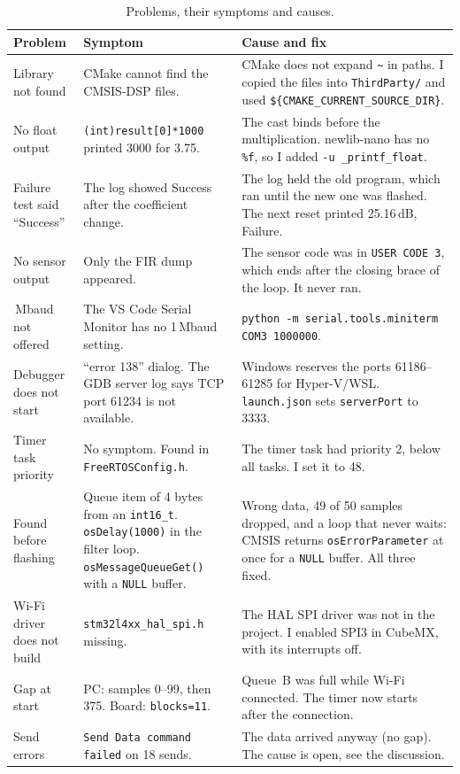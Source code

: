 \documentclass[11pt,a4paper]{article}
\begin{document}
\begin{table}[H]
\centering
\caption{Problems, their symptoms and causes.}
\label{tab:problems}
\footnotesize
\begin{tabular}{@{}>{\raggedright\arraybackslash}p{2.9cm}%
                  >{\raggedright\arraybackslash}p{5.0cm}%
                  >{\raggedright\arraybackslash}p{7.3cm}@{}}
\toprule
Problem & Symptom & Cause and fix \\
\midrule
Library not found &
  CMake cannot find the CMSIS-DSP files. &
  CMake does not expand \texttt{\~{}} in paths. I copied the files into
  \texttt{ThirdParty/} and used \texttt{\$\{CMAKE\_CURRENT\_SOURCE\_DIR\}}. \\
No float output &
  \texttt{(int)result[0]*1000} printed 3000 for 3.75. &
  The cast binds before the multiplication. newlib-nano has no
  \texttt{\%f}, so I added \texttt{-u \_printf\_float}. \\
Failure test said ``Success'' &
  The log showed Success after the coefficient change. &
  The log held the old program, which ran until the new one was flashed. The
  next reset printed 25.16\,dB, Failure. \\
No sensor output &
  Only the FIR dump appeared. &
  The sensor code was in \texttt{USER CODE 3}, which ends after the closing
  brace of the loop. It never ran. \\
1\,Mbaud not offered &
  The VS Code Serial Monitor has no 1\,Mbaud setting. &
  \texttt{python -m serial.tools.miniterm COM3 1000000}. \\
Debugger does not start &
  ``error 138'' dialog. The GDB server log says TCP port 61234 is not
  available. &
  Windows reserves the ports 61186--61285 for Hyper-V/WSL. \texttt{launch.json}
  sets \texttt{serverPort} to 3333. \\
Timer task priority &
  No symptom. Found in \texttt{FreeRTOSConfig.h}. &
  The timer task had priority 2, below all tasks. I set it to 48. \\
Found before flashing &
  Queue item of 4 bytes from an \texttt{int16\_t}. \texttt{osDelay(1000)} in
  the filter loop. \texttt{osMessageQueueGet()} with a \texttt{NULL} buffer. &
  Wrong data, 49 of 50 samples dropped, and a loop that never waits: CMSIS
  returns \texttt{osErrorParameter} at once for a \texttt{NULL} buffer. All
  three fixed. \\
Wi-Fi driver does not build &
  \texttt{stm32l4xx\_hal\_spi.h} missing. &
  The HAL SPI driver was not in the project. I enabled SPI3 in CubeMX, with
  its interrupts off. \\
Gap at start &
  PC: samples 0--99, then 375. Board: \texttt{blocks=11}. &
  Queue~B was full while Wi-Fi connected. The timer now starts after the
  connection. \\
Send errors &
  \texttt{Send Data command failed} on 18 sends. &
  The data arrived anyway (no gap). The cause is open, see the discussion. \\
\bottomrule
\end{tabular}
\end{table}
\end{document}
